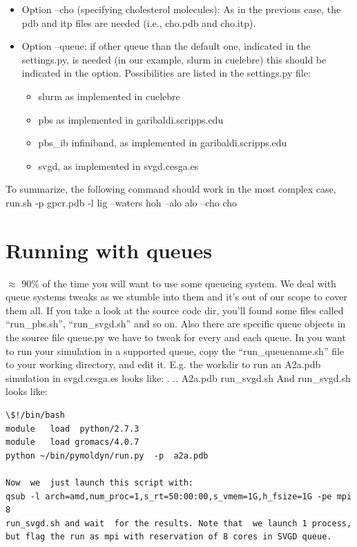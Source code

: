 \documentclass[10pt, oneside, pdftex]{article}
\begin{document}
\begin{itemize}
\begin{itemize}
{  structural waters: ion-local.pdb  and ion-local.itp.}  
\item{Option --cho
  (specifying cholesterol molecules): As in the previous case, the pdb
  and  itp files  are needed  (i.e., cho.pdb  and cho.itp).}
\item{Option --queue:  if other  queue than  the  default one,  indicated in  the
  settings.py,  is needed  (in our  example, slurm  in  cuelebre) this
  should be indicated  in the option. Possibilities are  listed in the
  settings.py  file:}
\begin{itemize}
\item{slurm  as  implemented in  cuelebre}
\item{pbs  as  implemented  in   garibaldi.scripps.edu}
\item{pbs\_ib   infiniband,  as implemented  in  garibaldi.scripps.edu}
\item{svgd, as  implemented  in svgd.cesga.es}
\end{itemize}
\end{itemize}
\end{itemize}

To summarize, the following command should work in the most complex case,
run.sh -p gpcr.pdb -l lig --waters hoh --alo alo --cho cho

\section*{Running with queues}
$\approx$ 90\% of the time you will  want to use some queueing system. We
deal with queue systems tweaks as we stumble into them and it's out of
our scope to  cover them all.  If  you take a look at  the source code
dir, you'll found some  files called ``run\_pbs.sh'', ``run\_svgd.sh''
and so  on. Also there are  specific queue objects in  the source file
queue.py we have  to tweak for every  and each queue.  In  you want to
run    your   simulation    in   a    supported   queue,    copy   the
``run\_queuename.sh''  file  to  your   working  directory,  and  edit
it. E.g.   the workdir to  run an A2a.pdb simulation  in svgd.cesga.es
looks like: . .. A2a.pdb run\_svgd.sh And run\_svgd.sh looks like:
\begin{Verbatim}
\$!/bin/bash   
module   load  python/2.7.3
module   load gromacs/4.0.7
python ~/bin/pymoldyn/run.py  -p  a2a.pdb 

Now  we  just launch this script with: 
qsub -l arch=amd,num_proc=1,s_rt=50:00:00,s_vmem=1G,h_fsize=1G -pe mpi 8
run_svgd.sh and wait  for the results. Note that  we launch 1 process,
but flag the run as mpi with reservation of 8 cores in SVGD queue.
\end{Verbatim}
\end{document}
